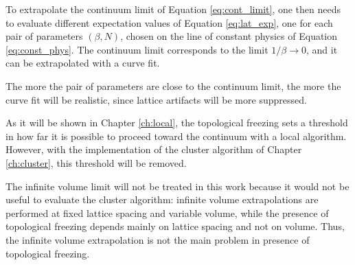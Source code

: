 To extrapolate the continuum limit of Equation \eqref{eq:cont_limit},
one then needs to evaluate different expectation values of Equation \eqref{eq:lat_exp},
one for each pair of parameters $(\beta,N)$, chosen on the line of constant physics of Equation \eqref{eq:const_phys}.
The continuum limit corresponds to the limit $1/\beta\to0$, and it can be extrapolated with a curve fit.

The more the pair of parameters are close to the continuum limit, the more the curve fit will be realistic,
since lattice artifacts will be more suppressed. 

As it will be shown in Chapter \ref{ch:local}, the topological freezing sets a threshold in how far it is possible to proceed toward the continuum with a local algorithm.
However, with the implementation of the cluster algorithm of Chapter \ref{ch:cluster}, this threshold will be removed.

The infinite volume limit will not be treated in this work
because it would not be useful to evaluate the cluster algorithm:
infinite volume extrapolations are performed at fixed lattice spacing and variable volume,
while the presence of topological freezing depends mainly on lattice spacing and not on volume.
Thus, the infinite volume extrapolation is not the main problem in presence of topological freezing.

